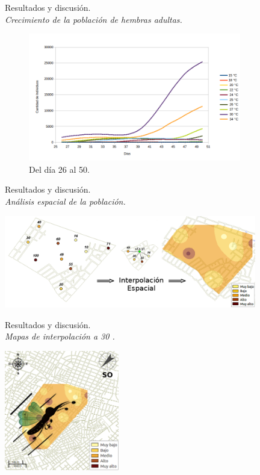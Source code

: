 \begin{frame}[t]{Resultados y discusión.\\\textit{Crecimiento de la población de hembras adultas.}}
\begin{figure}
    \includegraphics[width=9.3cm]{./graphics/poblacion-adulto-p2.png}
    \caption{Del día 26 al 50.}
\end{figure}
\end{frame}

\begin{frame}[t]{Resultados y discusión.\\\textit{Análisis espacial de la población.}}
\begin{center}
    \includegraphics[width=11cm]{./graphics/identificacion-focos.png}
\end{center}
\end{frame}

\begin{frame}[t]{Resultados y discusión.\\\textit{Mapas de interpolación a 30 \textcelsius.}}
\begin{center}
    \includegraphics[width=5cm]{./graphics/raster-dispersion.png}
\end{center}
\end{frame}

